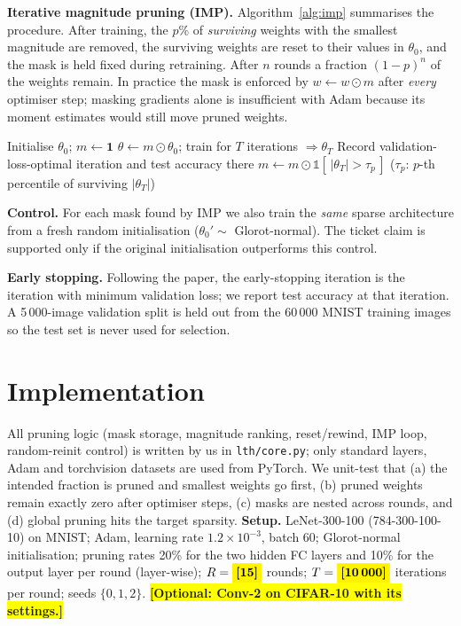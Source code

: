 \documentclass[conference]{IEEEtran}
\newcommand{\todo}[1]{\colorbox{yellow}{\textbf{[#1]}}}
\begin{document}
\textbf{Iterative magnitude pruning (IMP).} Algorithm~\ref{alg:imp} summarises the procedure. After training, the $p\%$ of \emph{surviving} weights with the smallest magnitude are removed, the surviving weights are reset to their values in $\theta_0$, and the mask is held fixed during retraining. After $n$ rounds a fraction $(1-p)^n$ of the weights remain. In practice the mask is enforced by $w\leftarrow w\odot m$ after \emph{every} optimiser step; masking gradients alone is insufficient with Adam because its moment estimates would still move pruned weights.

\begin{algorithm}[t]
\caption{Iterative magnitude pruning with reset to $\theta_0$}\label{alg:imp}
\begin{algorithmic}[1]
\STATE Initialise $\theta_0$; $m\gets\mathbf{1}$
  \STATE $\theta\gets m\odot\theta_0$; train for $T$ iterations $\Rightarrow\theta_T$
  \STATE Record validation-loss-optimal iteration and test accuracy there
  \STATE $m\gets m\odot\mathbb{1}[\,|\theta_T|>\tau_p\,]$ \hfill ($\tau_p$: $p$-th percentile of surviving $|\theta_T|$)
\ENDFOR
\end{algorithmic}
\end{algorithm}

\textbf{Control.} For each mask found by IMP we also train the \emph{same} sparse architecture from a fresh random initialisation ($\theta_0'\sim$ Glorot-normal). The ticket claim is supported only if the original initialisation outperforms this control.

\textbf{Early stopping.} Following the paper, the early-stopping iteration is the iteration with minimum validation loss; we report test accuracy at that iteration. A 5\,000-image validation split is held out from the 60\,000 MNIST training images so the test set is never used for selection.

\section{Implementation}
All pruning logic (mask storage, magnitude ranking, reset/rewind, IMP loop, random-reinit control) is written by us in \texttt{lth/core.py}; only standard layers, Adam and torchvision datasets are used from PyTorch. We unit-test that (a) the intended fraction is pruned and smallest weights go first, (b) pruned weights remain exactly zero after optimiser steps, (c) masks are nested across rounds, and (d) global pruning hits the target sparsity.
\textbf{Setup.} LeNet-300-100 (784-300-100-10) on MNIST; Adam, learning rate $1.2\times10^{-3}$, batch 60; Glorot-normal initialisation; pruning rates 20\% for the two hidden FC layers and 10\% for the output layer per round (layer-wise); $R=\todo{15}$ rounds; $T=\todo{10\,000}$ iterations per round; seeds $\{0,1,2\}$. \todo{Optional: Conv-2 on CIFAR-10 with its settings.}
\end{document}
